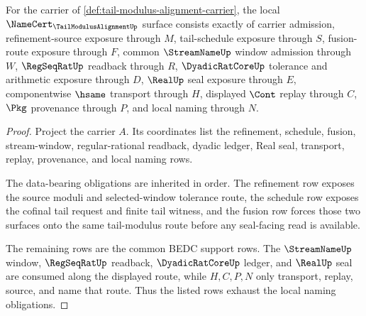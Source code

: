 \begin{theorem}
\label{thm:tail-modulus-alignment-obligation-surface}
For the carrier of \autoref{def:tail-modulus-alignment-carrier}, the local $\NameCert_{\TailModulusAlignmentUp}$ surface consists exactly of carrier admission, refinement-source exposure through $M$, tail-schedule exposure through $S$, fusion-route exposure through $F$, common $\StreamNameUp$ window admission through $W$, $\RegSeqRatUp$ readback through $R$, $\DyadicRatCoreUp$ tolerance and arithmetic exposure through $D$, $\RealUp$ seal exposure through $E$, componentwise $\hsame$ transport through $H$, displayed $\Cont$ replay through $C$, $\Pkg$ provenance through $P$, and local naming through $N$.
\end{theorem}
\begin{proof}
Project the carrier $A$. Its coordinates list the refinement, schedule, fusion, stream-window, regular-rational readback, dyadic ledger, Real seal, transport, replay, provenance, and local naming rows.

The data-bearing obligations are inherited in order. The refinement row exposes the source moduli and selected-window tolerance route, the schedule row exposes the cofinal tail request and finite tail witness, and the fusion row forces those two surfaces onto the same tail-modulus route before any seal-facing read is available.

The remaining rows are the common BEDC support rows. The $\StreamNameUp$ window, $\RegSeqRatUp$ readback, $\DyadicRatCoreUp$ ledger, and $\RealUp$ seal are consumed along the displayed route, while $H,C,P,N$ only transport, replay, source, and name that route. Thus the listed rows exhaust the local naming obligations.
\end{proof}

